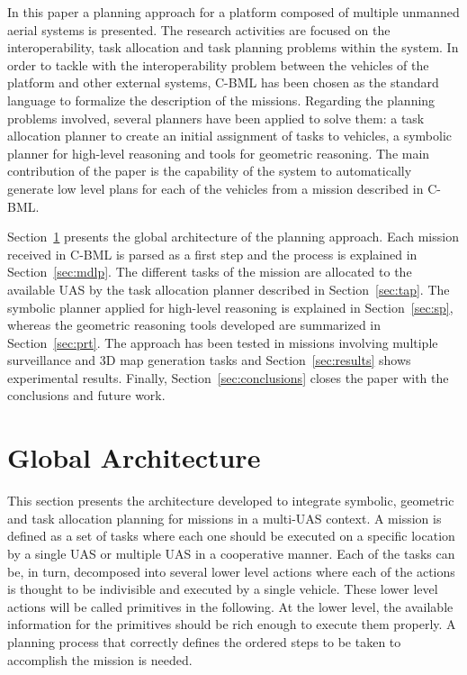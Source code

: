 \documentclass[twocolumn]{svjour3}          %
\begin{document}
In this paper a planning approach for a platform composed of multiple unmanned aerial systems is presented. The research activities are focused on the interoperability, task allocation 
and task planning problems within the system. In order to tackle with the interoperability problem between the vehicles of the platform and other external systems, C-BML has been chosen as the standard language to formalize the description of the missions. Regarding the planning problems involved, several planners have been applied to solve them: a task allocation planner to create an initial assignment of tasks to vehicles, a symbolic planner for high-level reasoning and tools for geometric reasoning. The main contribution of the paper is the capability of the system to automatically generate low level plans for each of the vehicles from a mission described in C-BML. 

Section~\ref{sec:architecture} presents the global architecture of the planning approach. Each mission received in C-BML is parsed as a first step and the process is explained in Section~\ref{sec:mdlp}. The different tasks of the mission are allocated to the available UAS by the task allocation planner described in Section~\ref{sec:tap}. The symbolic planner applied for high-level reasoning is explained in Section~\ref{sec:sp}, whereas the geometric reasoning tools developed are summarized in Section~\ref{sec:prt}. The approach has been tested in missions involving multiple surveillance and 3D map generation tasks and Section~\ref{sec:results} shows experimental results. Finally, Section~\ref{sec:conclusions} closes the paper with the conclusions and future work.

\section{Global Architecture}
	\label{sec:architecture}

This section presents the architecture developed to integrate symbolic, geometric and task allocation planning for missions in a multi-UAS context. A mission is defined as a set of tasks where each one should be executed on a specific location by a single UAS or multiple UAS in a cooperative manner. Each of the tasks can be, in turn, decomposed into several lower level actions where each of the actions is thought to be indivisible and executed by a single vehicle. These lower level actions will be called primitives in the following. At the lower level, the available information for the primitives should be rich enough to execute them properly. A planning process that correctly defines the ordered steps to be taken to accomplish the mission is needed. 
\end{document}

